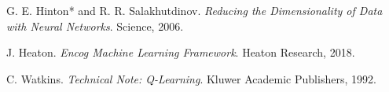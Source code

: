 \begin{thebibliography}{9}
G. E. Hinton* and R. R. Salakhutdinov.
\textit{Reducing the Dimensionality of Data with Neural Networks}. 
Science, 2006.

J. Heaton.
\textit{Encog Machine Learning Framework}. 
Heaton Research, 2018.

C. Watkins. 
\textit{Technical Note: Q-Learning}. 
Kluwer Academic Publishers, 1992.

\end{thebibliography}